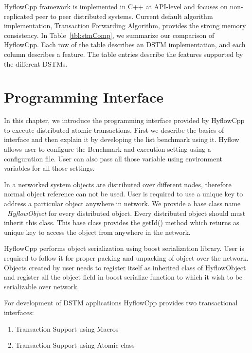 \documentclass[12pt,english]{report}
\begin{document}
HyflowCpp framework is implemented in C++ at API-level and focuses on non-replicated peer to peer distributed systems. Current default algorithm implementation, Transaction Forwarding Algorithm, provides the strong memory consistency. In Table~\ref{tbl:stmComp}, we summarize our comparison of HyflowCpp. Each row of the table describes an DSTM implementation, and each column describes a feature. The table entries describe the features supported by the different DSTMs.

\chapter{Programming Interface}\label{chap:progInterface}

In this chapter, we introduce the programming interface provided by HyflowCpp to execute distributed atomic transactions. First we describe the basics of interface and then explain it by developing the list benchmark using it. Hyflow allows user to configure the Benchmark and execution setting using a configuration file. User can also pass all those variable using environment variables for all those settings.

In a networked system objects are distributed over different nodes, therefore normal object reference can not be used. User is required to use a unique key to address a particular object anywhere in network. We provide a base class name ~\emph{HyflowObject} for every distributed object. Every distributed object should must inherit this class. This base class provides the getId() method which returns as unique key to access the object from anywhere in the network.

HyflowCpp performs object serialization using boost serialization library. User is required to follow it for proper packing and unpacking of object over the network. Objects created by user needs to register itself as inherited class of HyflowObject and register all the object field in boost serialize function to which it wish to be serializable over network.

For development of DSTM applications HyflowCpp provides two transactional interfaces: 
\begin{enumerate}
\item Transaction Support using Macros
\item Transaction Support using Atomic class 
\end{enumerate}
\end{document}
